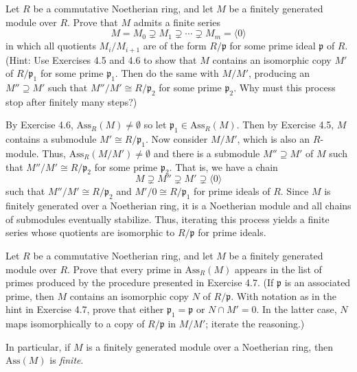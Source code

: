 \documentclass[../../master.tex]{subfiles}
\begin{document}
\begin{problem}
    Let $R$ be a commutative Noetherian ring, and let $M$ be a finitely generated module over $R$.
    Prove that $M$ admits a finite series
    \[
        M = M_0 \supsetneq M_1 \supsetneq \cdots \supsetneq M_m = \langle0\rangle
    \]
    in which all quotients $M_i / M_{i+1}$ are of the form $R / \mathfrak{p}$ for some prime ideal $\mathfrak{p}$ of $R$.
    (Hint: Use Exercises 4.5 and 4.6 to show that $M$ contains an isomorphic copy $M'$ of $R / \mathfrak{p}_1$ for some prime $\mathfrak{p}_1$.
    Then do the same with $M/M'$, producing an $M'' \supseteq M'$ such that $M''/M' \cong R/\mathfrak{p_2}$ for some prime $\mathfrak{p_2}$.
    Why must this process stop after finitely many steps?)
\end{problem}

\begin{solution}
    By Exercise 4.6, $\text{Ass}_R(M) \neq \emptyset$ so let $\mathfrak{p}_1 \in \text{Ass}_R(M)$.
    Then by Exercise 4.5, $M$ contains a submodule $M' \cong R / \mathfrak{p}_1$.
    Now consider $M/M'$, which is also an $R$-module.
    Thus, $\text{Ass}_R(M/M') \neq \emptyset$ and there is a submodule $M'' \supseteq M'$ of $M$ such that $M''/M' \cong R/\mathfrak{p}_2$ for some prime $\mathfrak{p}_2$.
    That is, we have a chain
    \[
        M \supsetneq M'' \supsetneq M' \supsetneq \langle 0 \rangle
    \]
    such that $M'' / M' \cong R / \mathfrak{p}_2$ and $M' / 0 \cong R / \mathfrak{p}_1$ for prime ideals of $R$.
    Since $M$ is finitely generated over a Noetherian ring, it is a Noetherian module and all chains of submodules eventually stabilize.
    Thus, iterating this process yields a finite series whose quotients are isomorphic to $R / \mathfrak{p}$ for prime ideals.
\end{solution}

\begin{problem}
    Let $R$ be a commutative Noetherian ring, and let $M$ be a finitely generated module over $R$.
    Prove that every prime in $\text{Ass}_R(M)$ appears in the list of primes produced by the procedure presented in Exercise 4.7.
    (If $\mathfrak{p}$ is an associated prime, then $M$ contains an isomorphic copy $N$ of $R / \mathfrak{p}$. 
    With notation as in the hint in Exercise 4.7, prove that either $\mathfrak{p}_1 = \mathfrak{p}$ or $N \cap M' = 0$.
    In the latter case, $N$ maps isomorphically to a copy of $R/\mathfrak{p}$ in $M/M'$;
    iterate the reasoning.)

    In particular, if $M$ is a finitely generated module over a Noetherian ring, then $\text{Ass}(M)$ is \textit{finite}.
\end{problem}
\end{document}
